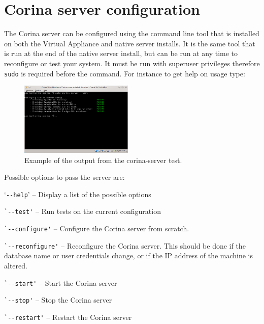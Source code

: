 \section{Corina server configuration}
\label{txt:serverConfig}

The Corina server can be configured using the command line tool that is installed on both the Virtual Appliance and native server installs.  It is the same tool that is run at the end of the native server install, but can be run at any time to reconfigure or test your system.  It must be run with superuser privileges therefore \verb|sudo| is required before the command.  For instance to get help on usage type:


\begin{figure}
  \begin{center}
    \includegraphics[width=0.48\textwidth]{Images/corina-server-terminal.png}
  \end{center}
  \caption{Example of the output from the corina-server test.}
  \label{fig:serverTerminal}
\end{figure}

Possible options to pass the server are:

\begin{itemize*}
 \item `\verb|--help|' -- Display a list of the possible options
 \item \verb|`--test'| -- Run tests on the current configuration
 \item \verb|`--configure'| -- Configure the Corina server from scratch.  
 \item \verb|`--reconfigure'| -- Reconfigure the Corina server.  This should be done if the database name or user credentials change, or if the IP address of the machine is altered.
 \item \verb|`--start'| -- Start the Corina server
 \item \verb|`--stop'| -- Stop the Corina server
 \item \verb|`--restart'| -- Restart the Corina server
\end{itemize*} 

